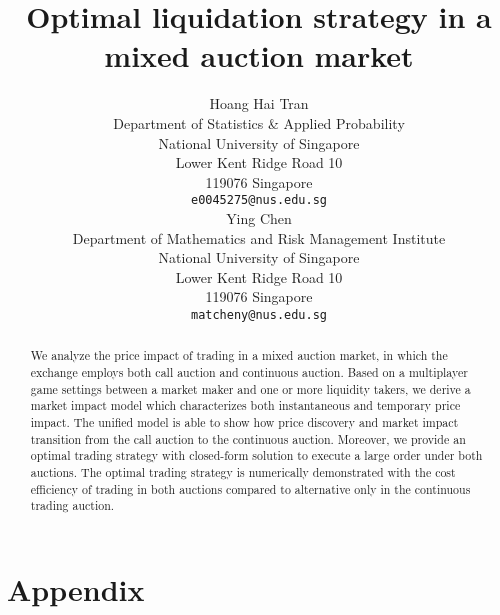 \documentclass{article}
\title{Optimal liquidation strategy in a mixed auction market}
\author{
 Hoang Hai Tran\\
 Department of Statistics \& Applied Probability\\
 National University of Singapore \\
 Lower Kent Ridge Road 10 \\
 119076 Singapore \\
 \texttt{e0045275@nus.edu.sg} \\
   \And
 Ying Chen\\
 Department of Mathematics and Risk Management Institute \\
 National University of Singapore \\
 Lower Kent Ridge Road 10 \\
 119076 Singapore \\
 \texttt{matcheny@nus.edu.sg} \\
}
\begin{document}
\maketitle

\begin{abstract}
  We analyze the price impact of trading in a mixed auction market, in which the exchange employs both call auction and continuous auction. Based on a multiplayer game settings between a market maker and one or more liquidity takers, we derive a market impact model which characterizes both instantaneous and temporary price impact. The unified model is able to show how price discovery and market impact transition from the call auction to the continuous auction. Moreover, we provide an optimal trading strategy with closed-form solution to execute a large order under both auctions. The optimal trading strategy is numerically demonstrated with the cost efficiency of trading in both auctions compared to alternative only in the continuous trading auction.
\end{abstract}

\section{Appendix}



\end{document}
